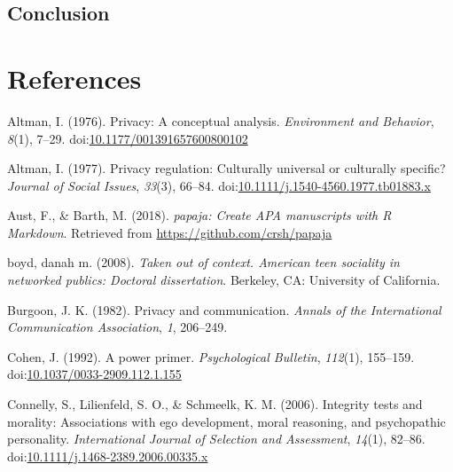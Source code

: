 \documentclass[man,floatsintext]{apa6}
\theoremstyle{definition}
\theoremstyle{definition}
\theoremstyle{definition}
\theoremstyle{remark}
\begin{document}
\hypertarget{conclusion}{%
\subsection{Conclusion}\label{conclusion}}

\newpage

\hypertarget{references}{%
\section{References}\label{references}}

\begingroup
\setlength{\parindent}{-0.5in}
\setlength{\leftskip}{0.5in}

\hypertarget{refs}{}
\leavevmode\hypertarget{ref-Altman.1976}{}%
Altman, I. (1976). Privacy: A conceptual analysis. \emph{Environment and
Behavior}, \emph{8}(1), 7--29.
doi:\href{https://doi.org/10.1177/001391657600800102}{10.1177/001391657600800102}

\leavevmode\hypertarget{ref-Altman.1977}{}%
Altman, I. (1977). Privacy regulation: Culturally universal or
culturally specific? \emph{Journal of Social Issues}, \emph{33}(3),
66--84.
doi:\href{https://doi.org/10.1111/j.1540-4560.1977.tb01883.x}{10.1111/j.1540-4560.1977.tb01883.x}

\leavevmode\hypertarget{ref-R-papaja}{}%
Aust, F., \& Barth, M. (2018). \emph{papaja: Create APA manuscripts with
R Markdown}. Retrieved from \url{https://github.com/crsh/papaja}

\leavevmode\hypertarget{ref-boyd.2008c}{}%
boyd, danah m. (2008). \emph{Taken out of context. American teen
sociality in networked publics: Doctoral dissertation}. Berkeley, CA:
University of California.

\leavevmode\hypertarget{ref-Burgoon.1982}{}%
Burgoon, J. K. (1982). Privacy and communication. \emph{Annals of the
International Communication Association}, \emph{1}, 206--249.

\leavevmode\hypertarget{ref-Cohen.1992}{}%
Cohen, J. (1992). A power primer. \emph{Psychological Bulletin},
\emph{112}(1), 155--159.
doi:\href{https://doi.org/10.1037/0033-2909.112.1.155}{10.1037/0033-2909.112.1.155}

\leavevmode\hypertarget{ref-Connelly.2006}{}%
Connelly, S., Lilienfeld, S. O., \& Schmeelk, K. M. (2006). Integrity
tests and morality: Associations with ego development, moral reasoning,
and psychopathic personality. \emph{International Journal of Selection
and Assessment}, \emph{14}(1), 82--86.
doi:\href{https://doi.org/10.1111/j.1468-2389.2006.00335.x}{10.1111/j.1468-2389.2006.00335.x}
\end{document}
